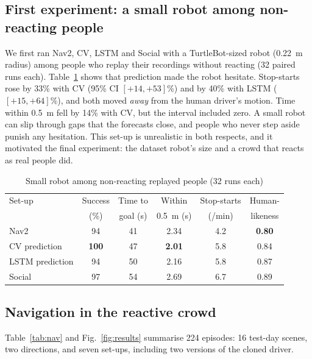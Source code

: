 \documentclass[conference]{IEEEtran}
\begin{document}
\subsection{First experiment: a small robot among non-reacting people}
We first ran Nav2, CV, LSTM and Social with a TurtleBot-sized robot (0.22~m radius) among people who replay their recordings without reacting (32 paired runs each). Table~\ref{tab:small} shows that prediction made the robot hesitate. Stop-starts rose by 33\% with CV (95\% CI $[+14, +53]$\%) and by 40\% with LSTM ($[+15, +64]$\%), and both moved \emph{away} from the human driver's motion. Time within 0.5~m fell by 14\% with CV, but the interval included zero. A small robot can slip through gaps that the forecasts close, and people who never step aside punish any hesitation. This set-up is unrealistic in both respects, and it motivated the final experiment: the dataset robot's size and a crowd that reacts as real people did.

\begin{table}[t]
\centering
\caption{Small robot among non-reacting replayed people (32 runs each)}
\label{tab:small}
\setlength{\tabcolsep}{4pt}
\begin{tabular}{lccccc}
\toprule
Set-up & Success & Time to & Within & Stop-starts & Human- \\
 & (\%) & goal (s) & 0.5~m (s) & (/min) & likeness \\
\midrule
Nav2 & 94 & 41 & 2.34 & 4.2 & \textbf{0.80} \\
CV prediction & \textbf{100} & 47 & \textbf{2.01} & 5.8 & 0.84 \\
LSTM prediction & 94 & 50 & 2.16 & 5.8 & 0.87 \\
Social & 97 & 54 & 2.69 & 6.7 & 0.89 \\
\bottomrule
\end{tabular}
\end{table}

\subsection{Navigation in the reactive crowd}
Table~\ref{tab:nav} and Fig.~\ref{fig:results} summarise 224 episodes: 16 test-day scenes, two directions, and seven set-ups, including two versions of the cloned driver.
\end{document}

